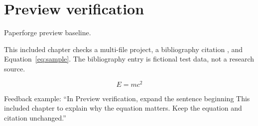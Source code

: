 \chapter{Preview verification}
Paperforge preview baseline.

This included chapter checks a multi-file project, a bibliography citation
\cite{preview-fixture}, and Equation~\eqref{eq:sample}.
The bibliography entry is fictional test data, not a research source.

\begin{equation}
  E = mc^2
  \label{eq:sample}
\end{equation}

Feedback example: ``In Preview verification, expand the sentence beginning
This included chapter to explain why the equation matters. Keep the equation
and citation unchanged.''
